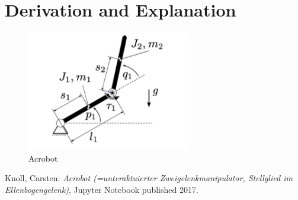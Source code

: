 \documentclass[10pt,a4paper]{article}
\begin{document}
	
	\section{Derivation and Explanation} %
	\begin{figure}[H]
		\centering
		\includegraphics[width=70mm]{acrobot.pdf}
		\caption{Acrobot}
	\end{figure}
	
	
	\begin{thebibliography}{10}		
		Knoll, Carsten: 
		\textit{Acrobot (=unteraktuierter Zweigelenkmanipulator, Stellglied im Ellenbogengelenk)}, Jupyter Notebook published 2017.
	\end{thebibliography}
\end{document}
